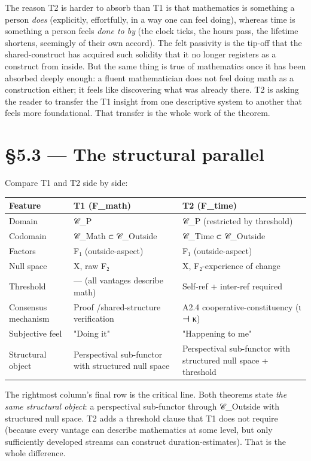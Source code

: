 \documentclass[11pt, openany]{book}
\newcommand{\sectionbreak}{\clearpage}
\begin{document}
The reason T2 is harder to absorb than T1 is that mathematics is something a person \textit{does} (explicitly, effortfully, in a way one can feel doing), whereas time is something a person feels \textit{done to by} (the clock ticks, the hours pass, the lifetime shortens, seemingly of their own accord). The felt passivity is the tip-off that the shared-construct has acquired such solidity that it no longer registers as a construct from inside. But the same thing is true of mathematics once it has been absorbed deeply enough: a fluent mathematician does not feel doing math as a construction either; it feels like discovering what was already there. T2 is asking the reader to transfer the T1 insight from one descriptive system to another that feels more foundational. That transfer is the whole work of the theorem.

\sectionbreak

\section{§5.3 --- The structural parallel}

Compare T1 and T2 side by side:

\begingroup\setlength{\tabcolsep}{3pt}\renewcommand{\arraystretch}{1.15}\footnotesize
\begin{center}
\begin{tabular}{p{0.62in} p{1.66in} p{2.05in}}
\toprule
Feature & T1 (F\_\allowbreak{}math) & T2 (F\_\allowbreak{}time) \\
\midrule
Domain & 𝒞\_\allowbreak{}P & 𝒞\_\allowbreak{}P (restricted by threshold) \\
Codomain & 𝒞\_\allowbreak{}Math ⊂ 𝒞\_\allowbreak{}Outside & 𝒞\_\allowbreak{}Time ⊂ 𝒞\_\allowbreak{}Outside \\
Factors & F₁ (outside-aspect) & F₁ (outside-aspect) \\
Null space & X, raw F₂ & X, F₂-experience of change \\
Threshold & --- (all vantages describe math) & Self-ref + inter-ref required \\
Consensus mechanism & Proof /\allowbreak  shared-structure verification & A2.4 cooperative-constituency (ι ⊣ κ) \\
Subjective feel & "Doing it" & "Happening to me" \\
Structural object & Perspectival sub-functor with structured null space & Perspectival sub-functor with structured null space + threshold \\
\bottomrule
\end{tabular}
\end{center}
\endgroup
The rightmost column's final row is the critical line. Both theorems state \textit{the same structural object}: a perspectival sub-functor through 𝒞\_\allowbreak{}Outside with structured null space. T2 adds a threshold clause that T1 does not require (because every vantage can describe mathematics at some level, but only sufficiently developed streams can construct duration-estimates). That is the whole difference.
\end{document}
